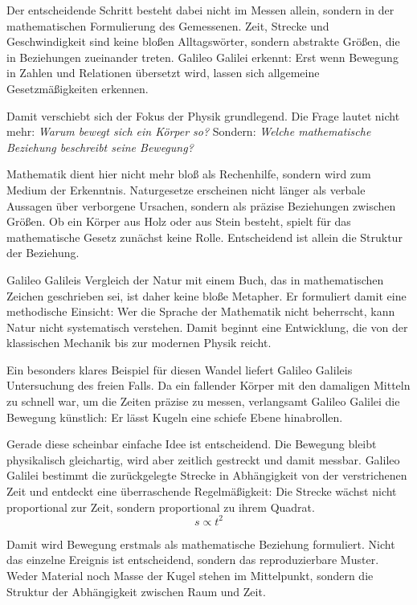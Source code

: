Der entscheidende Schritt besteht dabei nicht im Messen allein,
sondern in der mathematischen Formulierung des Gemessenen.
Zeit, Strecke und Geschwindigkeit
sind keine bloßen Alltagswörter,
sondern abstrakte Größen,
die in Beziehungen zueinander treten.
Galileo Galilei erkennt:
Erst wenn Bewegung in Zahlen und Relationen übersetzt wird,
lassen sich allgemeine Gesetzmäßigkeiten erkennen.

Damit verschiebt sich der Fokus der Physik grundlegend.
Die Frage lautet nicht mehr:
\emph{Warum bewegt sich ein Körper so?}
Sondern:
\emph{Welche mathematische Beziehung beschreibt seine Bewegung?}

Mathematik dient hier nicht mehr bloß als Rechenhilfe,
sondern wird zum Medium der Erkenntnis.
Naturgesetze
erscheinen nicht länger als verbale Aussagen über verborgene Ursachen,
sondern als präzise Beziehungen zwischen Größen.
Ob ein Körper aus Holz oder aus Stein besteht,
spielt für das mathematische Gesetz zunächst keine Rolle.
Entscheidend ist allein die Struktur der Beziehung.

Galileo Galileis Vergleich der Natur mit einem Buch,
das in mathematischen Zeichen geschrieben sei,
ist daher keine bloße Metapher.
Er formuliert damit eine methodische Einsicht:
Wer die Sprache der Mathematik nicht beherrscht,
kann Natur nicht systematisch verstehen.
Damit beginnt eine Entwicklung,
die von der klassischen Mechanik
bis zur modernen Physik reicht.

Ein besonders klares Beispiel für diesen Wandel
liefert Galileo Galileis Untersuchung des freien Falls.
Da ein fallender Körper mit den damaligen Mitteln
zu schnell war, um die Zeiten präzise zu messen,
verlangsamt Galileo Galilei die Bewegung künstlich:
Er lässt Kugeln eine schiefe Ebene hinabrollen.

Gerade diese scheinbar einfache Idee ist entscheidend.
Die Bewegung bleibt physikalisch gleichartig,
wird aber zeitlich gestreckt und damit messbar.
Galileo Galilei bestimmt die zurückgelegte Strecke
in Abhängigkeit von der verstrichenen Zeit
und entdeckt eine überraschende Regelmäßigkeit:
Die Strecke wächst nicht proportional zur Zeit,
sondern proportional zu ihrem Quadrat.
\[
s \propto t^{2}
\]

Damit wird Bewegung erstmals als mathematische Beziehung
formuliert.
Nicht das einzelne Ereignis ist entscheidend,
sondern das reproduzierbare Muster.
Weder Material noch Masse der Kugel stehen im Mittelpunkt,
sondern die Struktur der Abhängigkeit zwischen Raum und Zeit.


